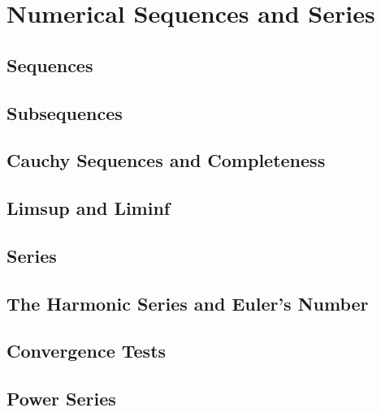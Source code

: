 \newpage
\section{Numerical Sequences and Series}
\subsection{Sequences}
\subsection{Subsequences}
\subsection{Cauchy Sequences and Completeness}
\subsection{Limsup and Liminf}
\subsection{Series}
\subsection{The Harmonic Series and Euler's Number}
\subsection{Convergence Tests}
\subsection{Power Series}

